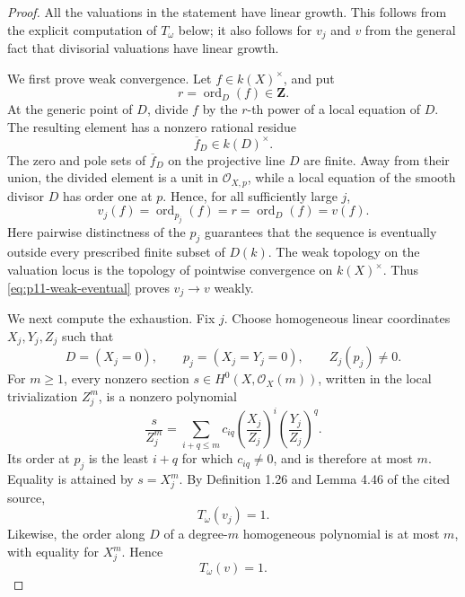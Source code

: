 \begin{proof}
All the valuations in the statement have linear growth.  This follows from
the explicit computation of \(T_\omega\) below; it also follows for
\(v_j\) and \(v\) from the general fact that divisorial valuations have
linear growth.

We first prove weak convergence.  Let \(f\in k(X)^\times\), and put
\[
                         r=\operatorname{ord}_D(f)\in\mathbf Z.
\]
At the generic point of \(D\), divide \(f\) by the \(r\)-th power of a
local equation of \(D\).  The resulting element has a nonzero rational
residue
\[
                         \overline f_D\in k(D)^\times.
\]
The zero and pole sets of \(\overline f_D\) on the projective line \(D\)
are finite.  Away from their union, the divided element is a unit in
\(\mathcal O_{X,p}\), while a local equation of the smooth divisor \(D\)
has order one at \(p\).  Hence, for all sufficiently large \(j\),
\[
                  v_j(f)=\operatorname{ord}_{p_j}(f)
                        =r
                        =\operatorname{ord}_D(f)=v(f).
\tag{1}\label{eq:p11-weak-eventual}
\]
Here pairwise distinctness of the \(p_j\) guarantees that the sequence is
eventually outside every prescribed finite subset of \(D(k)\).  The weak
topology on the valuation locus is the topology of pointwise convergence
on \(k(X)^\times\).  Thus \eqref{eq:p11-weak-eventual} proves
\(v_j\to v\) weakly.

We next compute the exhaustion.  Fix \(j\).  Choose homogeneous linear
coordinates \(X_j,Y_j,Z_j\) such that
\[
            D=(X_j=0),\qquad p_j=(X_j=Y_j=0),
            \qquad Z_j(p_j)\ne0.
\]
For \(m\geq1\), every nonzero section
\(s\in H^0(X,\mathcal O_X(m))\), written in the local trivialization
\(Z_j^m\), is a nonzero polynomial
\[
       \frac{s}{Z_j^m}
          =\sum_{i+q\leq m}c_{iq}
             \left(\frac{X_j}{Z_j}\right)^i
             \left(\frac{Y_j}{Z_j}\right)^q.
\tag{2}\label{eq:p11-local-polynomial}
\]
Its order at \(p_j\) is the least \(i+q\) for which \(c_{iq}\ne0\), and
is therefore at most \(m\).  Equality is attained by \(s=X_j^m\).  By
Definition 1.26 and Lemma 4.46 of the cited source,
\[
                         T_\omega(v_j)=1.
\tag{3}\label{eq:p11-T-point}
\]
Likewise, the order along \(D\) of a degree-\(m\) homogeneous polynomial
is at most \(m\), with equality for \(X_j^m\).  Hence
\[
                         T_\omega(v)=1.
\tag{4}\label{eq:p11-T-divisor}
\]


\end{proof}
